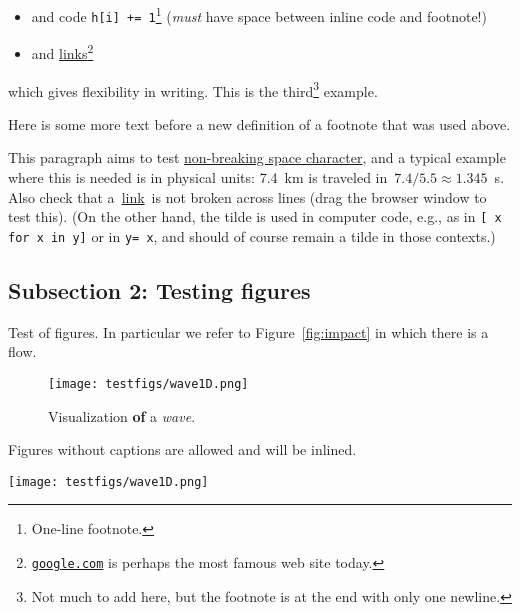 \documentclass[%
oneside,                 %
final,                   %
10pt]{article}
\newenvironment{notice_mdfboxadmon}[1][]{
\begin{notice_mdfboxmdframed}[frametitle=#1]
}
{
\end{notice_mdfboxmdframed}
}
\theoremstyle{definition}
\begin{document}
\begin{enumerate}
\begin{itemize}
 \item and code \texttt{h[i] += 1}\footnote{One-line footnote.} (\emph{must} have space between inline code and footnote!)

 \item and \href{{https://google.com}}{links}\footnote{\href{{google.com}}{\nolinkurl{google.com}} is perhaps the most famous web site today.}
\end{itemize}

\noindent
which gives flexibility in writing.
This is the third\footnote{Not much to add here, but the footnote is at the end with only one newline.} example.

Here is some more text before a new definition of a footnote that was
used above.


\begin{notice_mdfboxadmon}
This paragraph aims to test \href{{https://en.wikipedia.org/wiki/Non-breaking_space}}{non-breaking space character}, and a typical
example where this is needed is in physical units: 7.4~km is traveled
in~$7.4/5.5\approx 1.345$~s.  Also check that a~\href{{https://google.com}}{link}~is
not broken across lines (drag the browser window to test this).
(On the other hand, the tilde is used in
computer code, e.g., as in \texttt{[~x for x in y]} or in \texttt{y=~x}, and should
of course remain a tilde in those contexts.)
\end{notice_mdfboxadmon} %



\subsection{Subsection 2: Testing figures}
\label{subsec:ex}

Test of figures. In particular we refer to Figure~\vref{fig:impact} in which
there is a flow.

\begin{figure}[!ht]  %
  \centerline{\texttt{[image: testfigs/wave1D.png]}}
  \caption{
  Visualization \textbf{of} a \emph{wave}. \label{fig:impact}
  }
\end{figure}

Figures without captions are allowed and will be inlined.

\vspace{6mm}

\centerline{\texttt{[image: testfigs/wave1D.png]}}


\end{enumerate}
\end{document}
